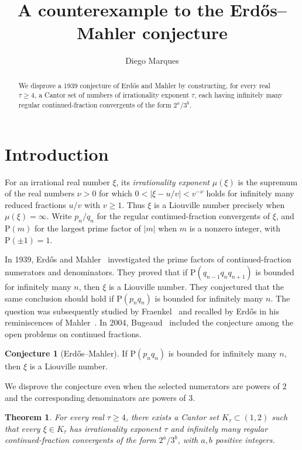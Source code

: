 \documentclass[11pt,reqno]{amsart}
\title{A counterexample to the Erd\H{o}s--Mahler conjecture}
\author[D. Marques]{Diego Marques}
\newtheorem*{theorem}{Theorem}
\theoremstyle{definition}
\newtheorem*{conjecture}{Conjecture}
\newcommand{\PP}{\mathrm P}
\begin{document}
\begin{abstract}
We disprove a 1939 conjecture of Erd\H{o}s and Mahler by constructing,
for every real $\tau\ge4$, a Cantor set of numbers of irrationality
exponent $\tau$, each having infinitely many regular continued-fraction
convergents of the form $2^a/3^b$.
\end{abstract}
\maketitle

\section{Introduction}\label{sec:intro}

For an irrational real number $\xi$, its \emph{irrationality exponent}
$\mu(\xi)$ is the supremum of the real numbers $\nu>0$ for which
$0<|\xi-u/v|<v^{-\nu}$ holds for infinitely many reduced fractions
$u/v$ with $v\ge1$. Thus $\xi$ is a Liouville number precisely when
$\mu(\xi)=\infty$. Write $p_n/q_n$ for the regular continued-fraction
convergents of $\xi$, and $\PP(m)$ for the largest prime factor of
$|m|$ when $m$ is a nonzero integer, with $\PP(\pm1)=1$.

In 1939, Erd\H{o}s and Mahler~\cite{EM} investigated
the prime factors of continued-fraction numerators
and denominators. They proved that if
$\PP(q_{n-1}q_nq_{n+1})$ is bounded for infinitely
many $n$, then $\xi$ is a Liouville number.
They conjectured that the same conclusion should
hold if $\PP(p_nq_n)$ is bounded for infinitely
many $n$. The question was subsequently studied by
Fraenkel~\cite{Fraenkel} and recalled by Erd\H{o}s
in his reminiscences of Mahler~\cite{ErdosReminiscences}. 
In 2004, Bugeaud~\cite[Problem~43, p.~215]{Bugeaud}
included the conjecture among the open problems
on continued fractions.

\begin{conjecture}[Erd\H{o}s--Mahler]
If $\PP(p_nq_n)$ is bounded for infinitely many $n$, then $\xi$ is
a Liouville number.
\end{conjecture}

We disprove the conjecture even when the selected numerators are
powers of $2$ and the corresponding denominators are powers of $3$.

\begin{theorem}
For every real $\tau\ge4$, there exists a Cantor set
$K_\tau\subset(1,2)$ such that every $\xi\in K_\tau$
has irrationality exponent $\tau$ and infinitely many regular
continued-fraction convergents of the form $2^a/3^b$, with $a,b$
positive integers.
\end{theorem}
\end{document}
